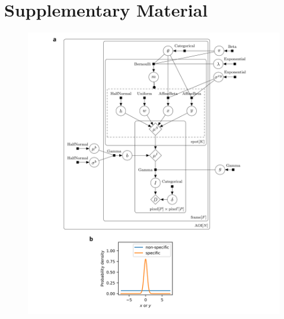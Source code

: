 \newpage

\section*{Supplementary Material}

\renewcommand{\figurename}{Extended Data Fig.}
\renewcommand{\thefigure}{S\arabic{figure}}
\renewcommand{\thetable}{S\arabic{table}}
% 

\setcounter{figure}{0}

\begin{figure}[t]
\centering
\includegraphics[width=183mm]{figures/sup1/sup1.png}

\end{figure}
